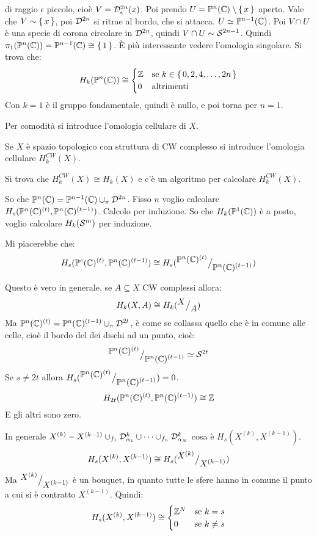 di raggio $ \epsilon $ piccolo, cioè $ V = \mathcal{D}^{2n}_\epsilon(x) $. Poi prendo
$ U = \mathbb{P}^{n} (\mathbb{C}) \setminus \set{x} $ aperto.
Vale che $ V \sim \set{x} $, poi $ \mathcal{D}^{2n} $ si ritrae al bordo, che
si attacca. $ U \simeq \mathbb{P}^{n-1} (\mathbb{C}) $.
Poi $ V \cap U $ è una specie di corona circolare in $ \mathcal{D}^{2n} $,
quindi $ V \cap U \sim \mathcal{S}^{2n -1} $. Quindi $ \pi_1(\mathbb{P}^{n} (\mathbb{C})) = \mathbb{P}^{n-1} (\mathbb{C}) \cong \set{1} $.
È più interessante vedere l'omologia singolare.
Si trova che:
\[
  H_k(\mathbb{P}^{n} (\mathbb{C})) \cong
  \begin{cases}
    \mathbb{Z} & \text{se } k \in \set{0,2,4,\dots, 2n} \\
    0 & \text{altrimenti}
  \end{cases}
\]
Con $ k = 1 $ è il gruppo fondamentale, quindi è nullo, e poi torna per $ n = 1 $.

Per comodità si introduce l'omologia cellulare di $ X $.

Se $ X $ è spazio topologico con struttura di CW complesso si introduce
l'omologia cellulare $ H_k^{CW}(X) $.

Si trova che $ H_k^{CW}(X) \cong H_k(X) $ e c'è un algoritmo per calcolare $ H_k^{CW}(X) $.

So che $ \mathbb{P}^{n} (\mathbb{C}) = \mathbb{P}^{n-1} (\mathbb{C}) \cup_\pi \mathcal{D}^{2n} $. Fisso $ n $ voglio calcolare
$ H_s(\mathbb{P}^{n} (\mathbb{C})^{(t)}, \mathbb{P}^{n} (\mathbb{C})^{(t-1)}) $.
Calcolo per induzione.
So che $ H_k(\mathbb{P}^{1} (\mathbb{C})) $ è a posto, voglio calcolare $ H_k(\mathcal{S}^{m}) $ per induzione.

Mi piacerebbe che:
\[
  H_s(\mathbb{P}^{c} (\mathbb{C})^{(t)}, \mathbb{P}^{n} (\mathbb{C})^{(t-1)}) \cong H_s({^{\textstyle \mathbb{P}^{n} (\mathbb{C})^{(t)}}\big/_{\textstyle \mathbb{P}^{n} (\mathbb{C})^{(t-1)}}})
\]

Questo è vero in generale, se $ A \subseteq X $ CW complessi allora:
\[
  H_k(X,A) \cong H_k({^{\textstyle X}\big/_{\textstyle A}})
\]
Ma $ \mathbb{P}^{n} (\mathbb{C})^{(t)} = \mathbb{P}^{n} (\mathbb{C})^{(t-1)} \cup_\pi \mathcal{D}^{2t} $, è come se collassa
quello che è in comune alle celle, cioè il bordo del dei dischi ad un punto,
cioè:
\[
  {^{\textstyle \mathbb{P}^{n} (\mathbb{C})^{(t)}}\big/_{\textstyle \mathbb{P}^{n} (\mathbb{C})^{(t-1)}}} \simeq \mathcal{S}^{2t}
\]
Se $ s \not = 2 t $ allora $ H_s({^{\textstyle \mathbb{P}^{n} (\mathbb{C})^{(t)}}\big/_{\textstyle \mathbb{P}^{n} (\mathbb{C})^{(t-1)}}}) = 0 $.
\[
  H_{2t}(\mathbb{P}^{n} (\mathbb{C})^{(t)}, \mathbb{P}^{n} (\mathbb{C})^{(t-1)}) \cong \mathbb{Z}
\]
E gli altri sono zero.

In generale $ X^{(k)}- X^{(k-1)} \cup_{f_1} \mathcal{D}^{k}_{\alpha_1} \cup \dots \cup_{f_n} \mathcal{D}^{k}_{\alpha_N} $
cosa è $ H_s(X^{(k)}, X^{(k-1)}) $.
\[
  H_s(X^{(k)}, X^{(k-1)}) \cong H_s({^{\textstyle X^{(k)}}\big/_{\textstyle X^{(k-1)}}})
\]
Ma $ {^{\textstyle X^{(k)}}\big/_{\textstyle X^{(k-1)}}} $ è un bouquet, in quanto tutte le sfere hanno in comune
il punto a cui si è contratto $ X^{(k-1)} $.
Quindi:
\[
  H_s(X^{(k)}, X^{(k-1)}) \cong
  \begin{cases}
    \mathbb{Z}^N & \text{se } k = s \\
    0 & \text{se } k \not = s
  \end{cases}
\]

